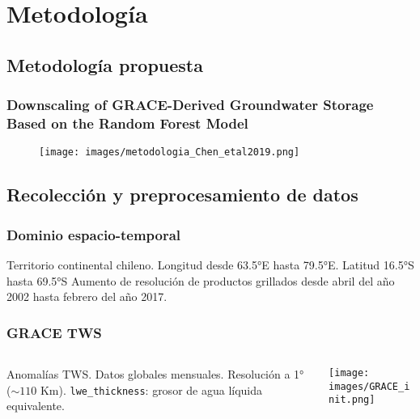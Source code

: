\documentclass{beamer}
\begin{document}
  \section{Metodología}
  \subsection*{Metodología propuesta}

  \begin{frame}
    \frametitle{Downscaling of GRACE-Derived Groundwater Storage Based on the Random Forest Model}

    \begin{figure}
      \begin{center}
        \texttt{[image: images/metodologia\_Chen\_etal2019.png]}
      \end{center}
  \end{figure}
    
  \end{frame}

  \subsection*{Recolección y preprocesamiento de datos}

  \begin{frame}
    \frametitle{Dominio espacio-temporal}

    \begin{outline}
      \1 Territorio continental chileno.
        \2 Longitud desde 63.5°E hasta 79.5°E.
        \2 Latitud 16.5°S hasta 69.5°S
      \1 Aumento de resolución de productos grillados desde abril del año 2002 hasta febrero del año 2017.
    \end{outline}
  \end{frame}

  \begin{frame}
    \frametitle{GRACE TWS}
    \begin{columns}

      \begin{column}{0.5\textwidth}
        \begin{outline}
          \1 Anomalías TWS.
          \1 Datos globales mensuales.
          \1 Resolución a 1° ($\sim 110$ Km).
          \1 \texttt{lwe\_thickness}: grosor de agua líquida equivalente.
        \end{outline}
      \end{column}

      \begin{column}{0.5\textwidth}
        \centering
        \texttt{[image: images/GRACE\_init.png]}
      \end{column}

    \end{columns}
  \end{frame}
\end{document}
